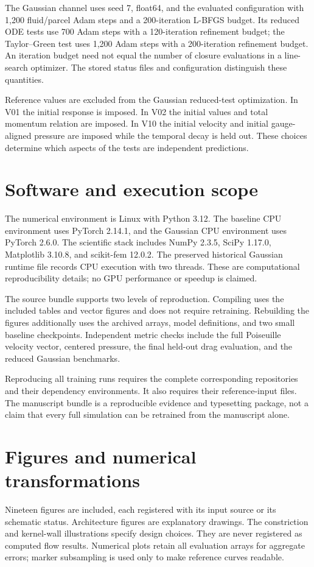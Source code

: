 The Gaussian channel uses seed 7, float64, and the evaluated configuration
with 1,200 fluid/parcel Adam steps and a 200-iteration L-BFGS budget. Its
reduced ODE tests use 700 Adam steps with a 120-iteration refinement budget;
the Taylor--Green test uses 1,200 Adam steps with a 200-iteration refinement
budget. An iteration budget need not equal the number of closure
evaluations in a line-search optimizer. The stored status files and
configuration distinguish these quantities.

Reference values are excluded from the Gaussian reduced-test optimization.
In V01 the initial response is imposed. In V02 the initial values and total
momentum relation are imposed. In V10 the initial velocity and initial
gauge-aligned pressure are imposed while the temporal decay is held out. These choices
determine which aspects of the tests are independent predictions.

\section{Software and execution scope}
The numerical environment is Linux with Python 3.12. The baseline CPU
environment uses PyTorch 2.14.1, and the Gaussian CPU environment uses
PyTorch 2.6.0. The scientific stack includes NumPy 2.3.5, SciPy 1.17.0,
Matplotlib 3.10.8, and scikit-fem 12.0.2. The preserved historical Gaussian
runtime file records CPU execution with two threads. These are
computational reproducibility details; no GPU performance or speedup is
claimed.

The source bundle supports two levels of reproduction. Compiling
 uses the included tables and vector figures and does not
require retraining. Rebuilding the figures additionally uses the archived
arrays, model definitions, and two small baseline checkpoints. Independent
metric checks include the full Poiseuille velocity vector, centered
pressure, the final held-out drag evaluation, and the reduced Gaussian
benchmarks.

Reproducing all training runs requires the complete corresponding
repositories and their dependency environments. It also requires their
reference-input files. The manuscript bundle is a reproducible evidence
and typesetting package, not a claim that every full simulation can be
retrained from the manuscript alone.

\section{Figures and numerical transformations}
Nineteen figures are included, each registered with its input source or
its schematic status. Architecture figures are explanatory drawings.
The constriction and kernel-wall illustrations specify design choices.
They are never registered as computed flow results. Numerical plots retain
all evaluation arrays for aggregate errors; marker subsampling is used only
to make reference curves readable.


